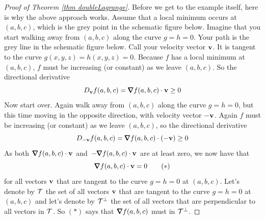 \begin{proof}[Proof of Theorem \ref{thm doubleLagrange}] 
Before we get to the example itself, here is why the above approach 
works. Assume that a local minimum occurs at $(a,b,c)$, which is the
grey point in the schematic figure below. Imagine that you start walking
away from $(a,b,c)$ along the curve $g=h=0$. Your path is the grey
line in the schematic figure below.
Call your velocity vector $\mathbf{v}$. It is tangent to the curve 
$g(x,y,z)=h(x,y,z)=0$. Because $f$ has a local minimum at $(a,b,c)$,
$f$ must be increasing (or constant) as we leave $(a,b,c)$. So
the directional derivative
\begin{equation*}
D_{\vv}f(a,b,c)=\vnabla f(a,b,c) \cdot \vv\ge 0
\end{equation*}
Now start over. Again walk away from $(a,b,c)$ along the curve $g=h=0$,
but this time moving in the opposite direction, with velocity vector 
$-\mathbf{v}$. Again $f$ must be increasing (or constant) as we leave 
$(a,b,c)$, so the directional derivative
\begin{equation*}
D_{-\vv}f(a,b,c)=\vnabla f(a,b,c) \cdot (-\vv)\ge 0
\end{equation*}
As both $\vnabla f(a,b,c) \cdot \vv$ and
$-\vnabla f(a,b,c) \cdot \vv$ are at least zero, we now have
that
\begin{equation*}
\vnabla f(a,b,c) \cdot \vv=0
\tag{$*$}\end{equation*}
for all vectors $\mathbf{v}$ that are tangent to the curve $g=h=0$
at $(a,b,c)$. Let's denote by $\mathcal{T}$ the set of all vectors $\mathbf{v}$ 
that are tangent to the curve $g=h=0$ at $(a,b,c)$ and let's denote
by $\mathcal{T}^\perp$ the set of all vectors that are perpendicular to all vectors
in $\mathcal{T}$. So $(*)$ says that $\vnabla f(a,b,c)$ must in $\mathcal{T}^\perp$.



\end{proof}
